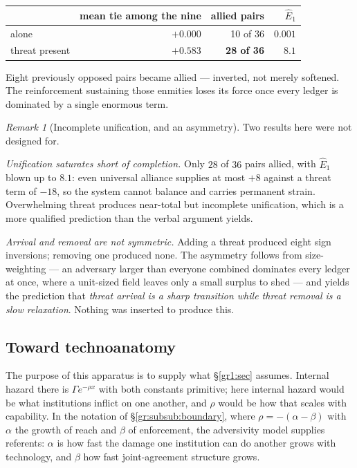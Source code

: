 \documentclass[11pt]{article}
\numberwithin{equation}{section}
\theoremstyle{plain}
\theoremstyle{definition}
\theoremstyle{remark}
\newtheorem{remark}[theorem]{Remark}
\begin{document}
\begin{center}\small
\begin{tabular}{@{}lrrr@{}}
\toprule
& mean tie among the nine & allied pairs & $\hat E_1$\\
\midrule
alone & $+0.000$ & 10 of 36 & $0.001$\\
threat present & $+0.583$ & \textbf{28 of 36} & $8.1$\\
\bottomrule
\end{tabular}
\end{center}

Eight previously opposed pairs became allied --- inverted, not merely
softened. The reinforcement sustaining those enmities loses its force
once every ledger is dominated by a single enormous term.

\begin{remark}[Incomplete unification, and an asymmetry]
\label{ad:rem:aliensreading}
Two results here were not designed for.

\emph{Unification saturates short of completion.} Only $28$ of $36$
pairs allied, with $\hat E_1$ blown up to $8.1$: even universal alliance
supplies at most $+8$ against a threat term of $-18$, so the system
cannot balance and carries permanent strain. Overwhelming threat
produces near-total but incomplete unification, which is a more
qualified prediction than the verbal argument yields.

\emph{Arrival and removal are not symmetric.} Adding a threat produced
eight sign inversions; removing one produced none. The asymmetry follows
from size-weighting --- an adversary larger than everyone combined
dominates every ledger at once, where a unit-sized field leaves only a
small surplus to shed --- and yields the prediction that \emph{threat
arrival is a sharp transition while threat removal is a slow
relaxation}. Nothing was inserted to produce this.
\end{remark}

\subsection{Toward technoanatomy}\label{ad:sub:toward}

The purpose of this apparatus is to supply what \S\ref{gr1:sec} assumes.
Internal hazard there is $\Gamma e^{-\rho x}$ with both constants
primitive; here internal hazard would be what institutions inflict on
one another, and $\rho$ would be how that scales with capability. In the
notation of \S\ref{gr:subsub:boundary}, where $\rho=-(\alpha-\beta)$
with $\alpha$ the growth of reach and $\beta$ of enforcement, the
adversivity model supplies referents: $\alpha$ is how fast the damage
one institution can do another grows with technology, and $\beta$ how
fast joint-agreement structure grows.
\end{document}

